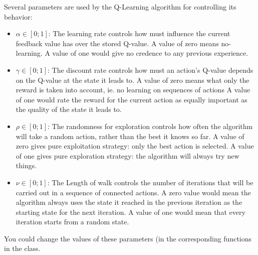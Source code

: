 \documentclass[article,english,nodocumentinfo]{multiagentfrreport}
\begin{document}
Several parameters are used by the Q-Learning algorithm for controlling its behavior:
\begin{itemize}
\item $\alpha \in [0;1]$: The learning rate controls how must influence the current feedback value has over the stored Q-value. A value of zero means no-learning. A value of one would give no credence to any previous
experience.
\item $\gamma \in [0;1]$: The discount rate controls how must an action's Q-value depends on the Q-value at the state it leads to. A value of zero means what only the reward is taken into account, ie. no learning on sequences of actions A value of one would rate the reward for the current action as equally important as the quality of the state it leads to.
\item $\rho \in [0;1]$: The randomness for exploration controls how often the algorithm will take a random action, rather than the best it knows so far. A value of zero gives pure exploitation strategy: only the best
action is selected. A value of one gives pure exploration strategy: the algorithm will always try new things.
\item $\nu \in [0;1]$: The Length of walk controls the number of iterations that will be carried out in a sequence of connected actions. A zero value would mean the algorithm always uses the state it reached in the previous iteration as the starting state for the next iteration. A value of one would mean that every iteration starts from a random state.
\end{itemize}

You could change the values of these parameters (in the corresponding functions in the  class.
\end{document}
